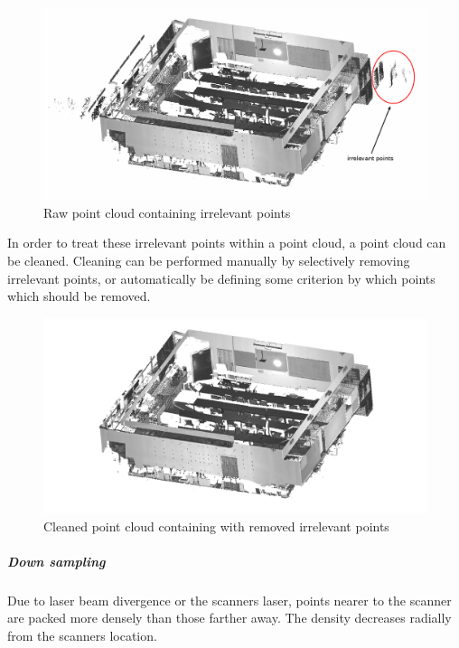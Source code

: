 \documentclass[11pt,a4paper]{report}
\begin{document}
						\begin{figure}[H]
							\centering
							\includegraphics[width=1\textwidth]{uncleaned_point_cloud}
							\caption{Raw point cloud containing irrelevant points}
							\label{fig:uncleaned_point_cloud}
						\end{figure}
						
						In order to treat these irrelevant points within a point cloud, a point cloud can be cleaned. Cleaning can be performed manually by selectively removing irrelevant points, or automatically be defining some criterion by which points which should be removed.
					
						\begin{figure}[H]
							\centering
							\includegraphics[width=1\textwidth]{cleaned_point_cloud}
							\caption{Cleaned point cloud containing with removed irrelevant points}
							\label{fig:cleaned_point_cloud}
						\end{figure}
						
					\subparagraph{Down sampling}
						Due to laser beam divergence or the scanners laser, points nearer to the scanner are packed more densely than those farther away. The density decreases radially from the scanners location.
						
\end{document}
